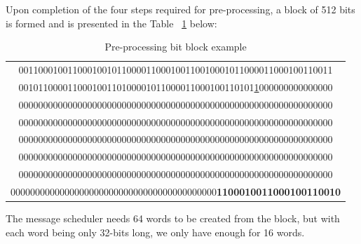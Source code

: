         Upon completion of the four steps required for pre-processing, a block of 512 bits is formed and is presented in the Table ~\ref{table:Pre-processing bit block example} below:
        \begin{table}[h!]
            
            \caption{Pre-processing bit block example}
            \label{table:Pre-processing bit block example}
            \begin{center}
            \begin{tabular}{|c|}
             \hline     
             0011000100110001001011000011000100110010001011000011000100110011 \\
             001011000011000100110100001011000011000100110101\underline{1}000000000000000 \\
             0000000000000000000000000000000000000000000000000000000000000000 \\
             0000000000000000000000000000000000000000000000000000000000000000 \\
             0000000000000000000000000000000000000000000000000000000000000000 \\
             0000000000000000000000000000000000000000000000000000000000000000 \\
             0000000000000000000000000000000000000000000000000000000000000000 \\
             000000000000000000000000000000000000000000\textbf{1100010011000100110010} \\
             \hline
            \end{tabular}
            \end{center}
            
        \end{table}
        
        The message scheduler needs 64 words to be created from the block, but with each word being only 32-bits long, we only have enough for 16 words. 
        
